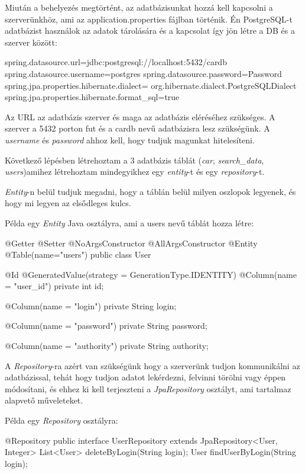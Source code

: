 Miután a behelyezés megtörtént, az adatbázisunkat hozzá kell kapcsolni a szerverünkhöz, ami az application.properties fájlban történik. Én PostgreSQL-t adatbázist használok az adatok tárolására és a kapcsolat így jön létre a DB és a szerver között:

\begin{java}
spring.datasource.url=jdbc:postgresql://localhost:5432/cardb
spring.datasource.username=postgres
spring.datasource.password=Password
spring.jpa.properties.hibernate.dialect=
  org.hibernate.dialect.PostgreSQLDialect
spring.jpa.properties.hibernate.format_sql=true
\end{java}

Az URL az adatbázis szerver és maga az adatbázis eléréséhez szükséges. A szerver a 5432 porton fut és a cardb nevű adatbázisra lesz szükségünk.
A \textit{username} és \textit{password} ahhoz kell, hogy tudjuk magunkat hitelesíteni.

Következő lépésben létrehoztam a 3 adatbázis táblát (\textit{car}, \textit{search\_data}, \textit{users})amihez létrehoztam mindegyikhez egy \textit{entity}-t és egy \textit{repository}-t.

\textit{Entity}-n belül tudjuk megadni, hogy a táblán belül milyen oszlopok legyenek, és hogy mi legyen az elsődleges kulcs.

Példa egy \textit{Entity} Java osztályra, ami a users nevű táblát hozza létre:

\begin{java}
@Getter
@Setter
@NoArgsConstructor
@AllArgsConstructor
@Entity
@Table(name="users")
public class User {
    @Id
    @GeneratedValue(strategy = GenerationType.IDENTITY)
    @Column(name = "user_id")
    private int id;

    @Column(name = "login")
    private String login;

    @Column(name = "password")
    private String password;

    @Column(name = "authority")
    private String authority;
}
\end{java}

A \textit{Repository}-ra azért van szükségünk hogy a szerverünk tudjon kommunikálni az adatbázissal, tehát hogy tudjon adatot lekérdezni, felvinni törölni vagy éppen módosítani, és ehhez ki kell terjeszteni a \textit{JpaRepository} osztályt, ami tartalmaz alapvető műveleteket.

Példa egy \textit{Repository} osztályra:

\begin{java}
@Repository
public interface UserRepository
extends JpaRepository<User, Integer> {
    List<User> deleteByLogin(String login);
    User findUserByLogin(String login);
}
\end{java}
\newpage

